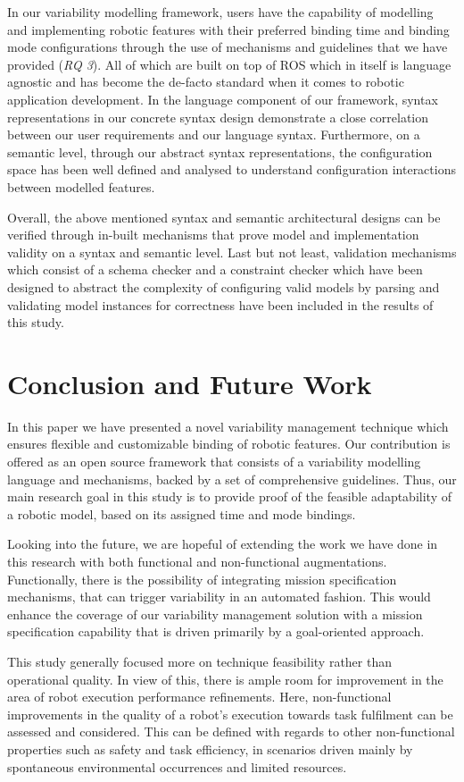 \documentclass[conference]{IEEEtran}
\begin{document}
In our variability modelling framework, users have the capability of modelling and implementing robotic features with their preferred binding time and binding mode configurations through the use of mechanisms and guidelines that we have provided (\textit{RQ 3}). All of which are built on top of ROS which in itself is language agnostic and has become the de-facto standard when it comes to robotic application development. In the language component of our framework, syntax representations in our concrete syntax design demonstrate a close correlation between our user requirements and our language syntax. Furthermore, on a semantic level, through our abstract syntax representations, the configuration space has been well defined and analysed to understand configuration interactions between modelled features.

Overall, the above mentioned syntax and semantic architectural designs can be verified through in-built mechanisms that prove model and implementation validity on a syntax and semantic level. Last but not least, validation mechanisms which consist of a schema checker and a constraint checker which have been designed to abstract the complexity of configuring valid models by parsing and validating model instances for correctness have been included in the results of this study.

\section{Conclusion and Future Work}
In this paper we have presented a novel variability management technique which ensures flexible and customizable binding of robotic features. Our contribution is offered as an open source framework that consists of a variability modelling language and mechanisms, backed by a set of comprehensive guidelines. Thus, our main research goal in this study is to provide proof of the feasible adaptability of a robotic model, based on its assigned time and mode bindings. 

Looking into the future, we are hopeful of extending the work we have done in this research with both functional and non-functional augmentations. Functionally, there is the possibility of integrating mission specification mechanisms, that can trigger variability in an automated fashion. This would enhance the coverage of our variability management solution with a mission specification capability that is driven primarily by a goal-oriented approach.

This study generally focused more on technique feasibility rather than operational quality. In view of this, there is ample room for improvement in the area of robot execution performance refinements. Here, non-functional improvements in the quality of a robot's execution towards task fulfilment can be assessed and considered. This can be defined with regards to other non-functional properties such as safety and task efficiency, in scenarios driven mainly by spontaneous environmental occurrences and limited resources.
\end{document}
